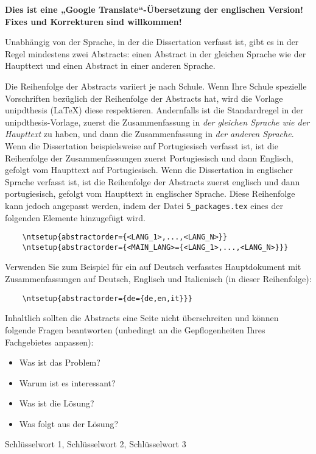 
%

\textbf{Dies ist eine „Google Translate“-Übersetzung der englischen Version! Fixes und Korrekturen sind willkommen!}

Unabhängig von der Sprache, in der die Dissertation verfasst ist, gibt es in der Regel mindestens zwei Abstracts: einen Abstract in der gleichen Sprache wie der Haupttext und einen Abstract in einer anderen Sprache.

Die Reihenfolge der Abstracts variiert je nach Schule. Wenn Ihre Schule spezielle Vorschriften bezüglich der Reihenfolge der Abstracts hat, wird die Vorlage \gls{unipdthesis} (\LaTeX) diese respektieren. Andernfalls ist die Standardregel in der \gls{unipdthesis}-Vorlage, zuerst die Zusammenfassung in \emph{der gleichen Sprache wie der Haupttext} zu haben, und dann die Zusammenfassung in \emph{der anderen Sprache}. Wenn die Dissertation beispielsweise auf Portugiesisch verfasst ist, ist die Reihenfolge der Zusammenfassungen zuerst Portugiesisch und dann Englisch, gefolgt vom Haupttext auf Portugiesisch. Wenn die Dissertation in englischer Sprache verfasst ist, ist die Reihenfolge der Abstracts zuerst englisch und dann portugiesisch, gefolgt vom Haupttext in englischer Sprache.
%
Diese Reihenfolge kann jedoch angepasst werden, indem der Datei \verb+5_packages.tex+ eines der folgenden Elemente hinzugefügt wird.

\begin{verbatim}
    \ntsetup{abstractorder={<LANG_1>,...,<LANG_N>}}
    \ntsetup{abstractorder={<MAIN_LANG>={<LANG_1>,...,<LANG_N>}}}
\end{verbatim}

Verwenden Sie zum Beispiel für ein auf Deutsch verfasstes Hauptdokument mit Zusammenfassungen auf Deutsch, Englisch und Italienisch (in dieser Reihenfolge):
\begin{verbatim}
    \ntsetup{abstractorder={de={de,en,it}}}
\end{verbatim}

Inhaltlich sollten die Abstracts eine Seite nicht überschreiten und können folgende Fragen beantworten (unbedingt an die Gepflogenheiten Ihres Fachgebietes anpassen):

\begin{itemize}
  \item Was ist das Problem?
  \item Warum ist es interessant?
  \item Was ist die Lösung?
  \item Was folgt aus der Lösung?
\end{itemize}

\begin{keywords}
Schlüsselwort 1, Schlüsselwort 2, Schlüsselwort 3
\end{keywords}
